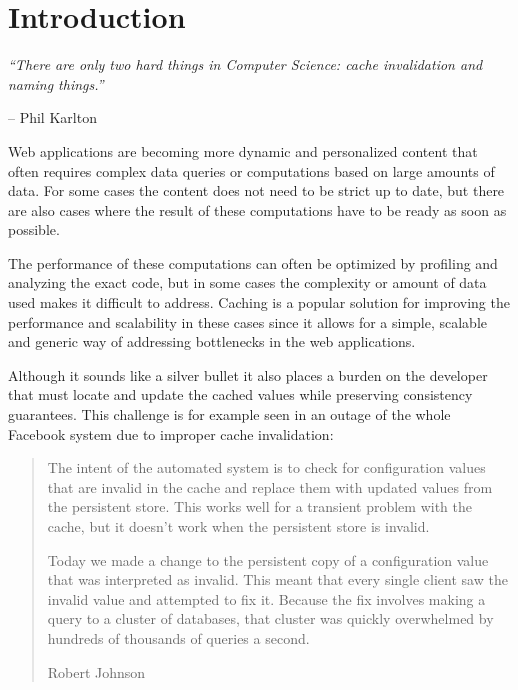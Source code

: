 \chapter{Introduction}

\emph{``There are only two hard things in Computer Science: cache invalidation and naming things.''} \vspace{-1cm}
\begin{flushright}-- Phil Karlton\end{flushright}

Web applications are becoming more dynamic and personalized content that often requires complex data queries or computations based on large amounts of data. For some cases the content does not need to be strict up to date, but there are also cases where the result of these computations have to be ready as soon as possible.

The performance of these computations can often be optimized by profiling and analyzing the exact code, but in some cases the complexity or amount of data used makes it difficult to address. Caching is a popular solution for improving the performance and scalability in these cases since it allows for a simple, scalable and generic way of addressing bottlenecks in the web applications.

Although it sounds like a silver bullet it also places a burden on the developer that must locate and update the cached values while preserving consistency guarantees. This challenge is for example seen in an outage of the whole Facebook system due to improper cache invalidation:

\begin{quote}
  The intent of the automated system is to check for configuration values that are invalid in the cache and replace them with updated values from the persistent store. This works well for a transient problem with the cache, but it doesn’t work when the persistent store is invalid.

  Today we made a change to the persistent copy of a configuration value that was interpreted as invalid. This meant that every single client saw the invalid value and attempted to fix it. Because the fix involves making a query to a cluster of databases, that cluster was quickly overwhelmed by hundreds of thousands of queries a second.
\begin{flushright}Robert Johnson~\cite{facebook_outage}\end{flushright}
\end{quote}

